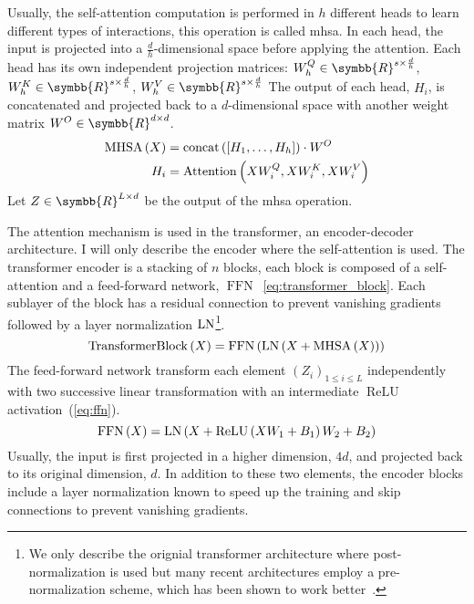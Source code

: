 \documentclass[../main.tex]{subfiles}
\begin{document}
	 Usually, the self-attention computation is performed in \(h\) different heads to learn different types of interactions, this operation is called \gls{mhsa}.
	 In each head, the input is projected into a \(\frac{d}{h}\)-dimensional space before applying the attention.
	 Each head has its own independent projection matrices: \(W^Q_h \in \symbb{R}^{s \times \frac{d}{h}}\), \(W^K_h \in \symbb{R}^{s \times \frac{d}{h}}\), \(W^V_h \in \symbb{R}^{s \times \frac{d}{h}}\)
	 The output of each head, \(H_i\), is concatenated and projected back to a \(d\)-dimensional space with another weight matrix \(W^O \in \symbb{R}^{d \times d}\).
	 \begin{align}
		 \operatorname{MHSA}\left(X\right) & = \operatorname{concat}\left(\left[H_1, \ldots, H_h \right] \right)\cdot W^O \\
		 H_i                 & = \operatorname{Attention}\left(XW^Q_i, XW^K_i, XW^V_i\right)
	 \end{align}
	 Let \(Z \in \symbb{R}^{L \times d}\) be the output of the \gls{mhsa} operation.

	 The attention mechanism is used in the transformer, an encoder-decoder architecture.
	 I will only describe the encoder where the self-attention is used.
	 The transformer encoder is a stacking of \(n\) blocks, each block is composed of a self-attention and a feed-forward network, \(\operatorname{FFN}\)~\cref{eq:transformer_block}.
	 Each sublayer of the block has a residual connection to prevent vanishing gradients followed by a layer normalization \(\operatorname{LN}\)\footnote{We only describe the orignial transformer architecture where post-normalization is used but many recent architectures employ a pre-normalization scheme, which has been shown to work better~\cite{TransformerpreLN}.}.
	 \begin{equation}
		\operatorname{TransformerBlock}\left(X\right) = \operatorname{FFN}\left(\operatorname{LN}\left(X + \operatorname{MHSA}\left(X\right)\right)\right)\label{eq:transformer_block}
	 \end{equation}
	 The feed-forward network transform each element \({\left(Z_i\right)}_{1 \leq i \leq L}\) independently with two successive linear transformation with an intermediate \(\operatorname{ReLU}\) activation~(\cref{eq:ffn}).
	 \begin{equation}%
		 \operatorname{FFN}\left(X\right) = \LN\left( X + \operatorname{ReLU}\left(XW_1 + B_1\right)W_2 + B_2\right) \label{eq:ffn}
	 \end{equation}
	 Usually, the input is first projected in a higher dimension, \(4d\), and projected back to its original dimension, \(d\).
	 In addition to these two elements, the encoder blocks include a layer normalization known to speed up the training and skip connections to prevent vanishing gradients.
\end{document}
